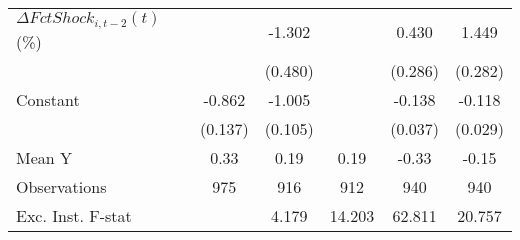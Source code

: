 {\begin{tabular}{l*{5}{c}}
\addlinespace
$ \Delta FctShock_{i,t-2}(t)$ (\%)&                     &      -1.302\sym{***}&                     &       0.430         &       1.449\sym{***}\\
                    &                     &     (0.480)         &                     &     (0.286)         &     (0.282)         \\
\addlinespace
Constant            &      -0.862\sym{***}&      -1.005\sym{***}&                     &      -0.138\sym{***}&      -0.118\sym{***}\\
                    &     (0.137)         &     (0.105)         &                     &     (0.037)         &     (0.029)         \\
\midrule
Mean Y              &        0.33         &        0.19         &        0.19         &       -0.33         &       -0.15         \\
Observations        &         975         &         916         &         912         &         940         &         940         \\
Exc. Inst. F-stat   &                     &       4.179         &      14.203         &      62.811         &      20.757         \\
\bottomrule
\end{tabular}
}
